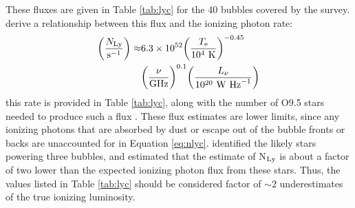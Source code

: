 These fluxes are given in Table \ref{tab:lyc} for the 40 bubbles covered by the \magpis survey.  derive a relationship between
this flux and the ionizing photon rate:
\begin{align}
\label{eq:nlyc}
\nonumber \biggl( { N_{\rm Ly} \over {\rm s}^{-1} } \biggr) \approx & 6.3 \times 10^{52}
\biggl( { T_{\rm e} \over 10^4 {\rm ~K} } \biggr)^{-0.45}\\
&\biggl( { \nu\over {\rm GHz} } \biggr)^{0.1}
\biggl( { L_\nu \over 10^{20} {\rm~W~Hz}^{-1} } \biggr)
\end{align}
this rate is provided in Table \ref{tab:lyc}, along with the number of O9.5 stars needed to produce such a flux \citep{Martins05}.
These flux estimates are lower limits, since any ionizing photons that are absorbed by dust or escape out of the bubble fronts or backs
are unaccounted for in Equation \ref{eq:nlyc}.  identified the likely stars powering three bubbles,
and estimated that the \magpis estimate of N$_{\rm Ly}$ is about a factor of two lower than the expected ionizing photon flux from these stars.
Thus, the values listed in Table \ref{tab:lyc} should be considered factor of $\sim 2$ underestimates of the true
ionizing luminosity.


